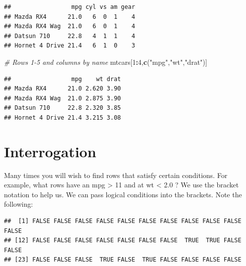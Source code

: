 \documentclass[]{book}
\newenvironment{Shaded}{\begin{snugshade}}{\end{snugshade}}
\newcommand{\CommentTok}[1]{\textcolor[rgb]{0.56,0.35,0.01}{\textit{#1}}}
\newcommand{\DecValTok}[1]{\textcolor[rgb]{0.00,0.00,0.81}{#1}}
\newcommand{\FloatTok}[1]{\textcolor[rgb]{0.00,0.00,0.81}{#1}}
\newcommand{\KeywordTok}[1]{\textcolor[rgb]{0.13,0.29,0.53}{\textbf{#1}}}
\newcommand{\NormalTok}[1]{#1}
\newcommand{\OperatorTok}[1]{\textcolor[rgb]{0.81,0.36,0.00}{\textbf{#1}}}
\newcommand{\StringTok}[1]{\textcolor[rgb]{0.31,0.60,0.02}{#1}}
\begin{document}
\begin{verbatim}
##                 mpg cyl vs am gear
## Mazda RX4      21.0   6  0  1    4
## Mazda RX4 Wag  21.0   6  0  1    4
## Datsun 710     22.8   4  1  1    4
## Hornet 4 Drive 21.4   6  1  0    3
\end{verbatim}

\begin{Shaded}
\begin{Highlighting}[]
\CommentTok{# Rows 1-5 and columns by name}
\NormalTok{mtcars[}\DecValTok{1}\OperatorTok{:}\DecValTok{4}\NormalTok{,}\KeywordTok{c}\NormalTok{(}\StringTok{"mpg"}\NormalTok{,}\StringTok{"wt"}\NormalTok{,}\StringTok{"drat"}\NormalTok{)]}
\end{Highlighting}
\end{Shaded}

\begin{verbatim}
##                 mpg    wt drat
## Mazda RX4      21.0 2.620 3.90
## Mazda RX4 Wag  21.0 2.875 3.90
## Datsun 710     22.8 2.320 3.85
## Hornet 4 Drive 21.4 3.215 3.08
\end{verbatim}

\hypertarget{interrogation}{%
\section{Interrogation}\label{interrogation}}

Many times you will wish to find rows that satisfy certain conditions. For example, what rows have an mpg \textgreater{} 11 and at
wt \textless{} 2.0 ? We use the bracket notation to help us. We can pass logical conditions into the brackets. Note the following:

\begin{Shaded}
\end{Shaded}

\begin{verbatim}
##  [1] FALSE FALSE FALSE FALSE FALSE FALSE FALSE FALSE FALSE FALSE FALSE
## [12] FALSE FALSE FALSE FALSE FALSE FALSE FALSE  TRUE  TRUE FALSE FALSE
## [23] FALSE FALSE FALSE  TRUE FALSE  TRUE FALSE FALSE FALSE FALSE
\end{verbatim}
\end{document}
